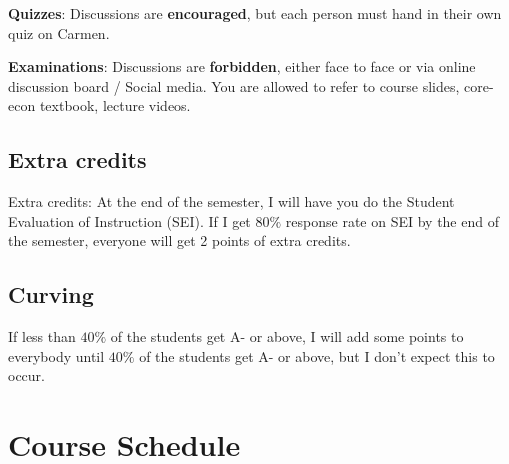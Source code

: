 \documentclass[12pt]{article}
\begin{document}
\textbf{Quizzes}: Discussions are \textbf{encouraged}, but each person must hand in their own quiz on Carmen.

\textbf{Examinations}: Discussions are \textbf{forbidden}, either face to face or via online discussion board / Social media. You are allowed to refer to course slides, core-econ textbook, lecture videos.

\subsection*{Extra credits}

Extra credits: At the end of the semester, I will have you do the Student Evaluation of Instruction (SEI). If I get $80\%$ response rate on SEI by the end of the semester, everyone will get 2 points of extra credits.

\subsection*{Curving}

If less than $40\%$ of the students get A- or above, I will add some points to everybody until $40\%$ of the students get A- or above, but I don’t expect this to occur.



\newpage

\section*{Course Schedule}
\end{document}
